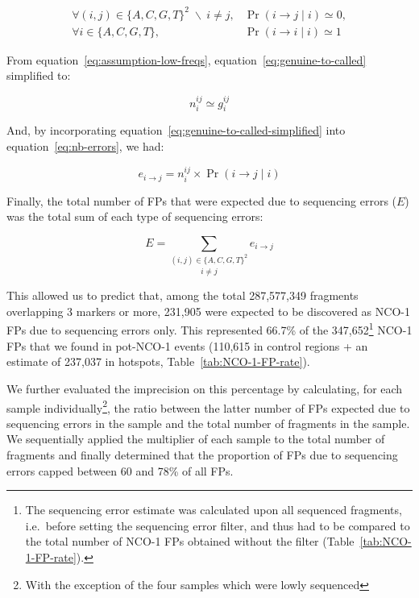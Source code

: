 \begin{subequations} 
	\begin{align}
		\forall (i,j) \in \{A, C, G, T\}^2 \; \backslash \: i \neq j,&\Pr( i\rightarrow j \mid i ) \simeq 0,\label{eq:assumption-low-freqs}\\
		\forall i \in \{A, C, G, T\},&\Pr( i\rightarrow i \mid i ) \simeq 1
	\end{align}
\end{subequations}


From equation~\ref{eq:assumption-low-freqs}, equation~\ref{eq:genuine-to-called} simplified to:

\begin{equation} \label{eq:genuine-to-called-simplified}
	n_{i}^{ij} \simeq g_{i}^{ij}
\end{equation}

And, by incorporating equation~\ref{eq:genuine-to-called-simplified} into equation~\ref{eq:nb-errors}, we had:

\begin{equation*} \label{eq:nb-errors-with-only-known-parameters}
	e_{i\rightarrow j} = n_{i}^{ij} \times \Pr( i\rightarrow j \mid i )
\end{equation*}


Finally, the total number of FPs that were expected due to sequencing errors ($E$) was the total sum of each type of sequencing errors: 

\begin{equation*} \label{eq:sum-all-NCOs-expected}
	E = \underset{i \neq j} {\sum_{(i, j) \in \{A, C, G, T\}^2}} e_{i\rightarrow j}
\end{equation*}




This allowed us to predict that, among the total 287,577,349 fragments overlapping 3 markers or more, 231,905 were expected to be discovered as NCO-1 FPs due to sequencing errors only.
This represented 66.7\% of the 347,652\footnote{The sequencing error estimate was calculated upon all sequenced fragments, i.e.\ before setting the sequencing error filter, and thus had to be compared to the total number of NCO-1 FPs obtained without the filter (Table~\ref{tab:NCO-1-FP-rate}).} NCO-1 FPs that we found in pot-NCO-1 events (110,615 in control regions + an estimate of 237,037 in hotspots, Table~\ref{tab:NCO-1-FP-rate}).

We further evaluated the imprecision on this percentage by calculating, for each sample individually\footnote{With the exception of the four samples which were lowly sequenced}, the ratio between the latter number of FPs expected due to sequencing errors in the sample and the total number of fragments in the sample. 
We sequentially applied the multiplier of each sample to the total number of fragments and finally determined that the proportion of FPs due to sequencing errors capped between 60 and 78\% of all FPs.\\


